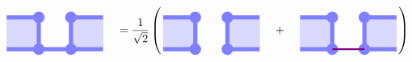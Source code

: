 \documentclass[report,paper=a4, fontsize=12pt, line_length=16cm, number_of_lines=33,dvipdfmx]{jlreq}
\numberwithin{equation}{chapter}
\begin{document}
\begin{align}
    \begin{tikzpicture}[baseline=0.5cm]
        \foreach \x in {0,2}{
            \foreach \y in {-2,-1,...,1}{
            \fill[plaqblue](\x,0) rectangle (\x+1,1);
            }
        }
        \foreach \x in {1,2}{
            \foreach \y in {0,1}{
                \fill[linkblue] (\x,\y) circle (1.8mm);
            }
        }
        \foreach \x/\y in {0/0,1/0,2/0,0/1,2/1}{
                \draw[linkblue, line width = 1.3mm](\x,\y)--(\x + 1,\y);
        }
        \foreach \x in {1,2}{
            \draw[linkblue, line width = 1.3mm](\x,0)--(\x, 1);
        }
    \end{tikzpicture}
    \quad = \frac{1}{\sqrt{2}}\left(
        \begin{tikzpicture}[baseline=0.5cm]
            \foreach \x in {0,2}{
                \foreach \y in {-2,-1,...,1}{
                \fill[plaqblue](\x,0) rectangle (\x+1,1);
                }
            }
            \foreach \x in {1,2}{
                \foreach \y in {0,1}{
                    \fill[linkblue] (\x,\y) circle (1.8mm);
                }
            }
            \foreach \x/\y in {0/0,2/0,0/1,2/1}{
                    \draw[linkblue, line width = 1.3mm](\x,\y)--(\x + 1,\y);
            }
            \foreach \x in {1,2}{
                \draw[linkblue, line width = 1.3mm](\x,0)--(\x, 1);
            }
        \end{tikzpicture}
        \quad + \quad
        \begin{tikzpicture}[baseline=0.5cm]
            \foreach \x in {0,2}{
                \foreach \y in {-2,-1,...,1}{
                \fill[plaqblue](\x,0) rectangle (\x+1,1);
                }
            }
            \foreach \x in {1,2}{
                \foreach \y in {0,1}{
                    \fill[linkblue] (\x,\y) circle (1.8mm);
                }
            }
            \foreach \x/\y in {0/0,2/0,0/1,2/1}{
                    \draw[linkblue, line width = 1.3mm](\x,\y)--(\x + 1,\y);
            }
            \foreach \x in {1,2}{
                \draw[linkblue, line width = 1.3mm](\x,0)--(\x, 1);
            }
            \draw[red!50!blue, ultra thick](1,0)--(2,0);
        \end{tikzpicture}        
    \right)
\end{align}
\end{document}
